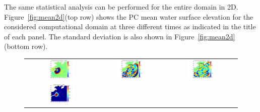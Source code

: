 The same statistical analysis can be performed for the
entire domain in 2D. Figure~\ref{fig:mean2d}(top row) shows
the PC mean water surface elevation for the considered computational
domain at three different times as indicated in the title of each panel.
The standard deviation is also shown in Figure~\ref{fig:mean2d}(bottom row).
\begin{figure}[h]
        \begin{tabular}{ccc}
\hspace*{-65pt}
\includegraphics[width=0.45\textwidth]{./figures/mean2d1.pdf} &
\hspace*{-65pt}
\includegraphics[width=0.45\textwidth]{./figures/mean2d3.pdf} &
\hspace*{-65pt}
\includegraphics[width=0.45\textwidth]{./figures/mean2d4.pdf} \\
\hspace*{-65pt}
\includegraphics[width=0.45\textwidth]{./figures/sigma2d1.pdf} &

\end{tabular}
\end{figure}
